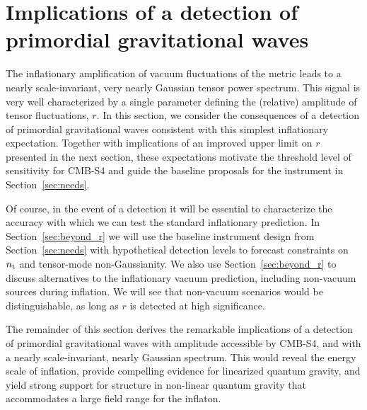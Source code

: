 \section{Implications of a detection of primordial gravitational waves}
\label{sec:detection}

The inflationary amplification of vacuum fluctuations of the metric leads to a nearly scale-invariant, very nearly Gaussian tensor power spectrum. This signal is very well characterized by a single parameter defining the (relative) amplitude of tensor fluctuations, $r$. In this section, we consider the consequences of a detection of primordial gravitational waves consistent with this simplest inflationary expectation. Together with implications of an improved upper limit on $r$ presented in the next section, these expectations motivate the threshold level of sensitivity for CMB-S4 and guide the baseline proposals for the instrument in Section~\ref{sec:needs}. 

Of course, in the event of a detection it will be essential to characterize the accuracy with which we can test the standard inflationary prediction. In Section~\ref{sec:beyond_r} we will use the baseline instrument design from Section~\ref{sec:needs} with hypothetical detection levels to forecast constraints on $n_{\rm t}$ and tensor-mode non-Gaussianity. We also use Section~\ref{sec:beyond_r} to discuss alternatives to the inflationary vacuum prediction, including non-vacuum sources during inflation. We will see that non-vacuum scenarios would be distinguishable, as long as $r$ is detected at high significance.

The remainder of this section derives the remarkable implications of a detection of primordial gravitational waves with amplitude accessible by CMB-S4, and with a nearly scale-invariant, nearly Gaussian spectrum.  This would reveal the energy scale of inflation, provide compelling evidence for linearized quantum gravity, and yield strong support for structure in non-linear quantum gravity that accommodates a large field range for the inflaton. 

